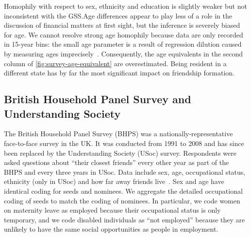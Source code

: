 \documentclass{scrartcl}
\begin{document}
Homophily with respect to sex, ethnicity and education is slightly weaker but not inconsistent with the GSS.\@ Age differences appear to play less of a role in the discussion of financial matters at first sight, but the inference is severely biased for age. We cannot resolve strong age homophily because data are only recorded in 15-year bins: the small age parameter is a result of regression dilution caused by measuring ages imprecisely~\cite{Hutcheon2010}. Consequently, the age equivalents in the second column of \cref{fig:survey-age-equivalent} are overestimated. Being resident in a different state has by far the most significant impact on friendship formation.

\subsection{British Household Panel Survey and Understanding Society\label{sec:survey-bhps-usoc}}

The British Household Panel Survey (BHPS) was a nationally-representative face-to-face survey in the UK. It was conducted from 1991 to 2008 and has since been replaced by the Understanding Society (USoc) survey. Respondents were asked questions about ``their closest friends'' every other year as part of the BHPS and every three years in USoc. Data include sex, age, occupational status, ethnicity (only in USoc) and how far away friends live~\cite{Institute-for-Social-and-Economic-Research2000, Institute-for-Social-and-Economic-Research2000}. Sex and age have identical coding for seeds and nominees. We aggregate the detailed occupational coding of seeds to match the coding of nominees. In particular, we code women on maternity leave as employed because their occupational status is only temporary, and we code disabled individuals as ``not employed'' because they are unlikely to have the same social opportunities as people in employment.
\end{document}

